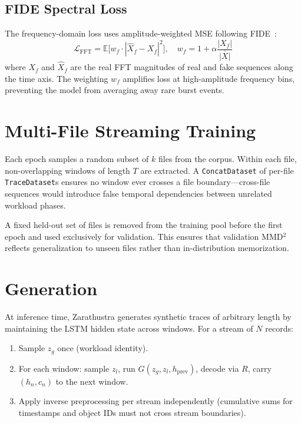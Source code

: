 \documentclass[10pt,twocolumn]{article}
\newcommand{\sys}{Zarathustra\xspace}
\begin{document}
\subsection{FIDE Spectral Loss}

The frequency-domain loss uses amplitude-weighted MSE following
FIDE~\cite{fide2024}:
\[
  \mathcal{L}_{\text{FFT}} =
    \mathbb{E}\bigl[w_f \cdot |\hat{X}_f - X_f|^2\bigr], \quad
  w_f = 1 + \alpha \frac{|X_f|}{\bar{|X|}}
\]
where $X_f$ and $\hat{X}_f$ are the real FFT magnitudes of real and
fake sequences along the time axis.  The weighting $w_f$ amplifies
loss at high-amplitude frequency bins, preventing the model from
averaging away rare burst events.


\section{Multi-File Streaming Training}
\label{sec:multifile}

Each epoch samples a random subset of $k$ files from the corpus.
Within each file, non-overlapping windows of length $T$ are extracted.
A \texttt{ConcatDataset} of per-file \texttt{TraceDataset}s ensures
no window ever crosses a file boundary---cross-file sequences would
introduce false temporal dependencies between unrelated workload
phases.

A fixed held-out set of files is removed from the training pool
before the first epoch and used exclusively for validation.  This
ensures that validation MMD$^2$ reflects generalization to unseen
files rather than in-distribution memorization.


\section{Generation}
\label{sec:generation}

At inference time, \sys generates synthetic traces of arbitrary length
by maintaining the LSTM hidden state across windows.  For a stream of
$N$ records:

\begin{enumerate}
  \item Sample $z_g$ once (workload identity).
  \item For each window: sample $z_l$, run $G(z_g, z_l, h_{\text{prev}})$,
        decode via $R$, carry $(h_n, c_n)$ to the next window.
  \item Apply inverse preprocessing per stream independently (cumulative
        sums for timestamps and object IDs must not cross stream boundaries).
\end{enumerate}
\end{document}
